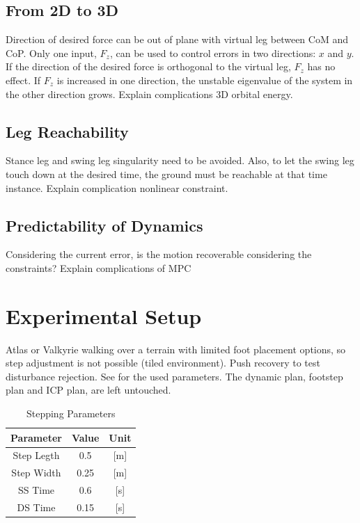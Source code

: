 \subsection{From 2D to 3D}
Direction of desired force can be out of plane with virtual leg between \ac{CoM} and \ac{CoP}. Only one input, $F_z$, can be used to control errors in two directions: $x$ and $y$. If the direction of the desired force is orthogonal to the virtual leg, $F_z$ has no effect. If $F_z$ is increased in one direction, the unstable eigenvalue of the system in the other direction grows. Explain complications 3D orbital energy. 
\subsection{Leg Reachability}
Stance leg and swing leg singularity need to be avoided. Also, to let the swing leg touch down at the desired time, the ground must be reachable at that time instance. Explain complication nonlinear constraint.
\subsection{Predictability of Dynamics}
Considering the current error, is the motion recoverable considering the constraints? Explain complications of \ac{MPC}

\section{Experimental Setup}
Atlas or Valkyrie walking over a terrain with limited foot placement options, so step adjustment is not possible (tiled environment). Push recovery to test disturbance rejection. See  for the used parameters. The dynamic plan, footstep plan and \ac{ICP} plan, are left untouched.
\begin{table}[ht]
\caption{Stepping Parameters} %
\centering %
\begin{tabular}{c c c } %
\hline\hline %
Parameter & Value & Unit \\
\hline %
Step Legth & 0.5 &  [m]\\
Step Width & 0.25 & [m]\\
\acs{SS} Time & 0.6 & [s]\\
\acs{DS} Time & 0.15 & [s]\\
\hline %
\end{tabular}
\label{tab:stepping} %
\end{table}

